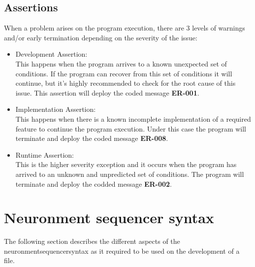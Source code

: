 \subsection{Assertions}

When a problem arises on the program execution, there are 3 levels of warnings and/or early termination depending on the severity of the issue:
\begin{itemize}
  \item Development Assertion:\\
  This happens when the program arrives to a known unexpected set of conditions. If the program can recover from this set of conditions it will continue, but it's highly recommended to check for the root cause of this issue. This assertion will deploy the coded message \textbf{ER-001}. \lotharcl
  \item Implementation Assertion:\\
  This happens when there is a known incomplete implementation of a required feature to continue the program execution. Under this case the program will terminate and deploy the coded message \textbf{ER-008}. \lotharcl
  \item Runtime Assertion:\\
  This is the higher severity exception and it occurs when the program has arrived to an unknown and unpredicted set of conditions. The program will terminate and deploy the codded message \textbf{ER-002}. \lotharcl
\end{itemize}

\section{Neuronment sequencer syntax}

The following section describes the different aspects of the \gls{neuronmentsequencersyntax} as it required to be used on the development of a  file.

